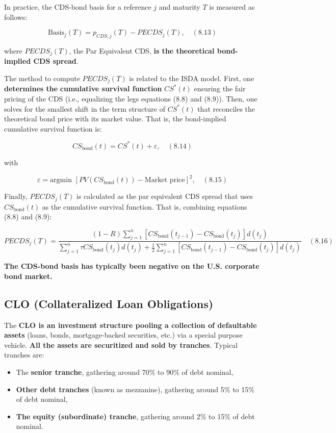 \documentclass[12pt,a4paper]{article}
\begin{document}
In practice, the CDS-bond basis for a reference $j$ and maturity $T$ is measured as follows:

$$\text{Basis}_j(T) = p_{CDS,j}(T) - PECDS_j(T), \quad (8.13)$$

where $PECDS_j(T)$, the Par Equivalent CDS, \textbf{is the theoretical bond-implied CDS spread}.

The method to compute $PECDS_j(T)$ is related to the ISDA model. First, one \textbf{determines the} \textbf{cumulative survival function} $CS^*(t)$ ensuring the fair pricing of the CDS (i.e., equalizing the legs equations (8.8) and (8.9)). Then, one solves for the smallest shift in the term structure of $CS^*(t)$ that reconciles the theoretical bond price with its market value. That is, the bond-implied cumulative survival function is:

$$CS_{\text{bond}}(t) = CS^*(t) + \varepsilon, \quad (8.14)$$

with

$$\varepsilon = \text{argmin } [PV(CS_{\text{bond}}(t)) - \text{Market price}]^2, \quad (8.15)$$

Finally, $PECDS_j(T)$ is calculated as the par equivalent CDS spread that uses $CS_{\text{bond}}(t)$ as the cumulative survival function. That is, combining equations (8.8) and (8.9):

$$PECDS_j(T) = \frac{(1 - R) \sum_{j=1}^{n}[CS_{\text{bond}}(t_{j-1}) - CS_{\text{bond}}(t_j)]d(t_j)}{\sum_{j=1}^{n} \tau CS_{\text{bond}}(t_j)d(t_j) + \frac{1}{2}\sum_{j=1}^{n} [CS_{\text{bond}}(t_{j-1}) - CS_{\text{bond}}(t_j)]d(t_j)} \quad (8.16)$$

\textbf{The CDS-bond basis has typically been negative on the U.S. corporate bond market.}






\subsection{CLO (Collateralized Loan Obligations)}

The \textbf{CLO is an investment structure pooling a collection of defaultable assets} (loans, bonds, mortgage-backed securities, etc.) via a special purpose vehicle. \textbf{All the assets are securitized and sold by tranches}. Typical tranches are:

\begin{itemize}
\item The \textbf{senior tranche}, gathering around 70\% to 90\% of debt nominal,
\item \textbf{Other debt tranches} (known as mezzanine), gathering around 5\% to 15\% of debt nominal,
\item \textbf{The equity (subordinate) tranche}, gathering around 2\% to 15\% of debt nominal.
\end{itemize}
\end{document}
